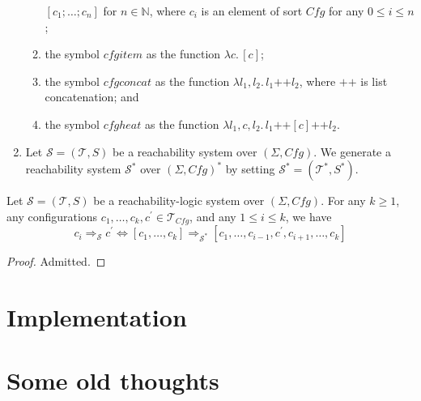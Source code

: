 \documentclass{article}
\newcommand{\Tcfg}{\mathcal{T}_{\mathit{Cfg}}}
\begin{document}
\begin{definition}
\begin{enumerate}
\begin{enumerate}
              $[c_1;\ldots;c_n]$ for $n \in \mathbb{N}$, where $c_i$ is an element of sort $\mathit{Cfg}$
              for any $0 \leq i \leq n$;
              \item the symbol $\mathit{cfgitem}$ as the function $\lambda c.\, [c]$;
              \item the symbol $\mathit{cfgconcat}$ as the function $\lambda l_1,l_2.\, l_1 \texttt{++} l_2$,
                where $\texttt{++}$ is list concatenation; and
              \item the symbol $\mathit{cfgheat}$ as the function
                $\lambda l_1, c, l_2.\, l_1 \texttt{++} [c] \texttt{++} l_2$.
          \end{enumerate}
          
    \item Let $\mathcal{S} = (\mathcal{T}, S)$ be a reachability system over $(\Sigma, \mathit{Cfg})$.
          We generate a reachability system $\mathcal{S}^*$ over $(\Sigma, \mathit{Cfg})^*$
          by setting $\mathcal{S}^* = (\mathcal{T}^*, S^*)$.
\end{enumerate}
\end{definition}

\begin{lemma}
    Let $\mathcal{S} = (\mathcal{T}, S)$ be a reachability-logic system over $(\Sigma, \mathit{Cfg})$.
    For any $k \geq 1$, any configurations $c_1,\ldots,c_k, c^\prime \in \Tcfg$, and any $1 \leq i \leq k$,
    we have
    \begin{equation*}
        c_i \Rightarrow_{\mathcal{S}} c^\prime
                    \iff
        [c_1,\ldots,c_k] \Rightarrow_{\mathcal{S}^*} [c_1, \ldots, c_{i-1}, c^\prime, c_{i+1}, \ldots, c_k]
    \end{equation*}
\end{lemma}
\begin{proof}
Admitted.
\end{proof}

\section{Implementation}




\appendix

\section{Some old thoughts}
\end{document}
